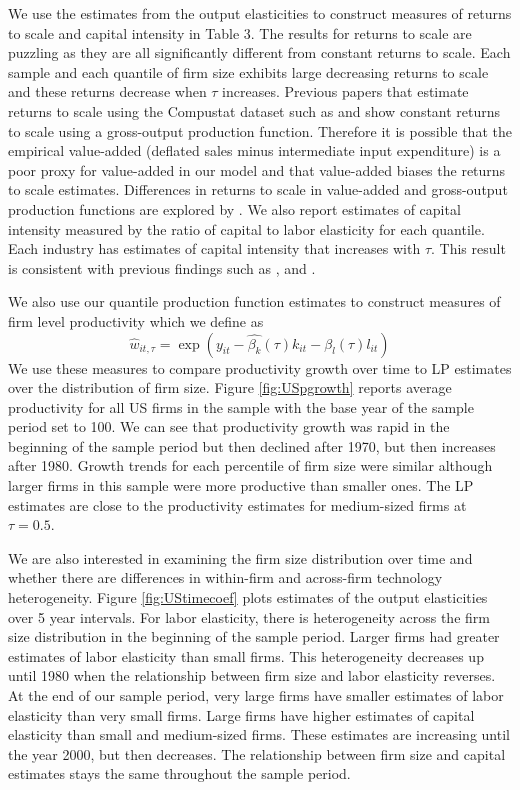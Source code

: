 \documentclass[11pt]{article}
\begin{document}
We use the estimates from the output elasticities to construct measures of returns to scale and capital intensity in Table 3. The results for returns to scale are puzzling as they are all significantly different from constant returns to scale. Each sample and each quantile of firm size exhibits large decreasing returns to scale and these returns decrease when $\tau$ increases. Previous papers that estimate returns to scale using the Compustat dataset such as \cite{Keller2009} and \cite{mert} show constant returns to scale using a gross-output production function. Therefore it is possible that the empirical value-added (deflated sales minus intermediate input expenditure) is a poor proxy for value-added in our model and that value-added biases the returns to scale estimates. Differences in returns to scale in value-added and gross-output production functions are explored by \cite{Basu1997}. We also report estimates of capital intensity measured by the ratio of capital to labor elasticity for each quantile. Each industry has estimates of capital intensity that increases with $\tau$. This result is consistent with previous findings such as \cite{Holmes2008}, \cite{Kumar1999} and \cite{mert}.




We also use our quantile production function estimates to construct measures of firm level productivity which we define as
\begin{equation}
\hat{w}_{it,\tau}=\exp(y_{it}-\hat{\beta_{k}}(\tau)k_{it}-\hat{\beta_{l}}(\tau)l_{it})
\end{equation}
We use these measures to compare productivity growth over time to LP estimates over the distribution of firm size. Figure \ref{fig:USpgrowth} reports average productivity for all US firms in the sample with the base year of the sample period set to 100. We can see that productivity growth was rapid in the beginning of the sample period but then declined after 1970, but then increases after 1980. Growth trends for each percentile of firm size were similar although larger firms in this sample were more productive than smaller ones. The LP estimates are close to the productivity estimates for medium-sized firms at $\tau=0.5$.

We are also interested in examining the firm size distribution over time and whether there are differences in within-firm and across-firm technology heterogeneity. Figure \ref{fig:UStimecoef} plots estimates of the output elasticities over 5 year intervals. For labor elasticity, there is heterogeneity across the firm size distribution in the beginning of the sample period. Larger firms had greater estimates of labor elasticity than small firms. This heterogeneity decreases up until 1980 when the relationship between firm size and labor elasticity reverses. At the end of our sample period, very large firms have smaller estimates of labor elasticity than very small firms. Large firms have higher estimates of capital elasticity than small and medium-sized firms. These estimates are increasing until the year 2000, but then decreases. The relationship between firm size and capital estimates stays the same throughout the sample period.
\end{document}
